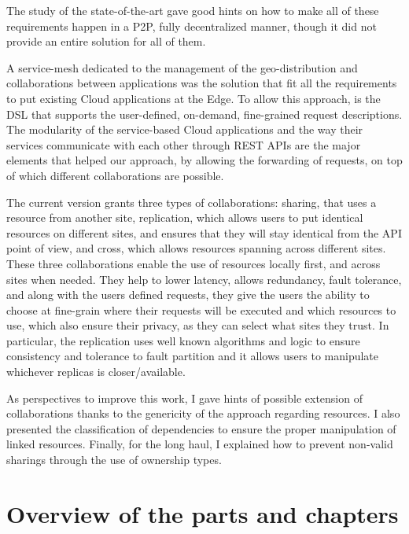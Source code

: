 The study of the state-of-the-art gave good hints on how to make all
of these requirements happen in a P2P, fully decentralized manner,
though it did not provide an entire solution for all of them.

%
A service-mesh dedicated to the management of the geo-distribution and
collaborations between applications was the solution that fit all the
requirements to put existing Cloud applications at the Edge.
%
To allow this approach, \scl is the DSL that supports the
user-defined, on-demand, fine-grained request descriptions.
%
The modularity of the service-based Cloud applications and the way
their services communicate with each other through REST APIs are the
major elements that helped our approach, by allowing the forwarding of
requests, on top of which different collaborations are possible.


The current version grants three types of collaborations: sharing,
that uses a resource from another site, replication, which allows
users to put identical resources on different sites, and ensures that
they will stay identical from the API point of view, and cross, which
allows resources spanning across different sites.
%
These three collaborations enable the use of resources locally first,
and across sites when needed.
%
They help to lower latency, allows redundancy, fault tolerance, and
along with the users defined requests, they give the users the ability
to choose at fine-grain where their requests will be executed and
which resources to use, which also ensure their privacy, as they can
select what sites they trust.
%
In particular, the replication uses well known algorithms and logic to
ensure consistency and tolerance to fault partition and it allows
users to manipulate whichever replicas is closer/available.

As perspectives to improve this work, I gave hints of possible
extension of collaborations thanks to the genericity of the approach
regarding resources.
%
I also presented the classification of dependencies to ensure the
proper manipulation of linked resources.
%
Finally, for the long haul, I explained how to prevent non-valid
sharings through the use of ownership types.
%

\section*{Overview of the parts and chapters}

